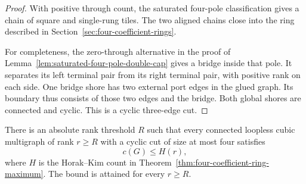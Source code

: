 \begin{proof}
With positive through count, the saturated four-pole classification gives a chain of square and single-rung tiles.
The two aligned chains close into the ring described in Section~\ref{sec:four-coefficient-rings}.

For completeness, the zero-through alternative in the proof of Lemma~\ref{lem:saturated-four-pole-double-cap} gives a bridge inside that pole.
It separates its left terminal pair from its right terminal pair, with positive rank on each side.
One bridge shore has two external port edges in the glued graph.
Its boundary thus consists of those two edges and the bridge.
Both global shores are connected and cyclic.
This is a cyclic three-edge cut.
\end{proof}

\begin{theorem}
\label{thm:four-coefficient-eventual-small-cut}
There is an absolute rank threshold $R$ such that every connected loopless cubic multigraph of rank $r\ge R$ with a cyclic cut of size at most four satisfies
\[
 c(G)\le H(r),
\]
where $H$ is the Horak--Kim count in Theorem~\ref{thm:four-coefficient-ring-maximum}.
The bound is attained for every $r\ge R$.
\end{theorem}

